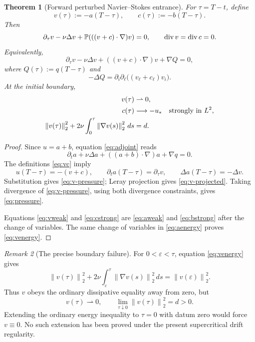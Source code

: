 \documentclass[11pt]{article}
\newtheorem{theorem}{Theorem}
\theoremstyle{remark}
\newtheorem{remark}[theorem]{Remark}
\newcommand{\Pp}{\mathbb P}
\newcommand{\norm}[1]{\left\|#1\right\|}
\newcommand{\weakto}{\rightharpoonup}
\newcommand{\diver}{\mathop{\rm div}}
\begin{document}
\begin{theorem}[Forward perturbed Navier--Stokes entrance]
\label{thm:reverse}
For \(\tau=T-t\), define
\begin{equation}
\label{eq:vc}
 v(\tau):=-a(T-\tau),\qquad
 c(\tau):=-b(T-\tau).
\end{equation}
Then
\begin{equation}
\label{eq:v-projected}
 \partial_\tau v-\nu\Delta v+
 \Pp(((v+c)\cdot\nabla)v)=0,
 \qquad \diver v=\diver c=0.
\end{equation}
Equivalently,
\begin{equation}
\label{eq:v-pressure}
 \partial_\tau v-\nu\Delta v+
 ((v+c)\cdot\nabla)v+\nabla Q=0,
\end{equation}
where \(Q(\tau):=q(T-\tau)\) and
\begin{equation}
\label{eq:pressure}
 -\Delta Q=
 \partial_i\partial_\ell\bigl((v_\ell+c_\ell)v_i\bigr).
\end{equation}
At the initial boundary,
\begin{align}
\label{eq:vweak}
 v(\tau)&\weakto0,\\
\label{eq:cstrong}
 c(\tau)&\longrightarrow-u_*
 \quad\hbox{strongly in }L^2,\\
\label{eq:venergy}
 \norm{v(\tau)}_2^2+
 2\nu\int_0^\tau\norm{\nabla v(s)}_2^2\,ds&=d.
\end{align}
\end{theorem}

\begin{proof}
Since \(u=a+b\), equation \eqref{eq:adjoint} reads
\[
 \partial_ta+\nu\Delta a+
 ((a+b)\cdot\nabla)a+\nabla q=0.
\]
The definitions \eqref{eq:vc} imply
\[
 u(T-\tau)=-(v+c),\qquad
 \partial_ta(T-\tau)=\partial_\tau v,\qquad
 \Delta a(T-\tau)=-\Delta v.
\]
Substitution gives \eqref{eq:v-pressure}; Leray projection gives
\eqref{eq:v-projected}.  Taking divergence of
\eqref{eq:v-pressure}, using both divergence constraints, gives
\eqref{eq:pressure}.

Equations \eqref{eq:vweak} and \eqref{eq:cstrong} are
\eqref{eq:aweak} and \eqref{eq:bstrong} after the change of variables.
The same change of variables in \eqref{eq:aenergy} proves
\eqref{eq:venergy}.
\end{proof}

\begin{remark}[The precise boundary failure]
For \(0<\varepsilon<\tau\), equation \eqref{eq:venergy} gives
\begin{equation}
\label{eq:positive-energy}
 \norm{v(\tau)}_2^2+
 2\nu\int_\varepsilon^\tau\norm{\nabla v(s)}_2^2\,ds
 =\norm{v(\varepsilon)}_2^2.
\end{equation}
Thus \(v\) obeys the ordinary dissipative equality away from zero, but
\[
 v(\tau)\weakto0,\qquad
 \lim_{\tau\downarrow0}\norm{v(\tau)}_2^2=d>0.
\]
Extending the ordinary energy inequality to \(\tau=0\) with datum zero
would force \(v\equiv0\).  No such extension has been proved under the
present supercritical drift regularity.
\end{remark}
\end{document}
